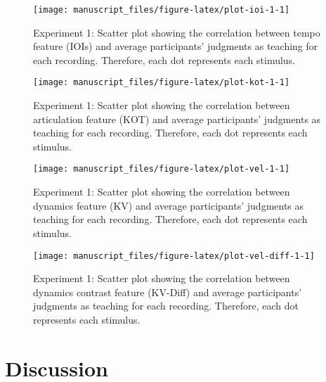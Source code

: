 \documentclass[
  man,floatsintext]{apa6}
\begin{document}
\begin{figure}

{\centering \texttt{[image: manuscript\_files/figure-latex/plot-ioi-1-1]} 

}

\caption{\label{fig:ioi-1}Experiment 1: Scatter plot showing the correlation between tempo feature (IOIs) and average participants' judgments as teaching for each recording. Therefore, each dot represents each stimulus.}\label{fig:plot-ioi-1}
\end{figure}

\begin{figure}

{\centering \texttt{[image: manuscript\_files/figure-latex/plot-kot-1-1]} 

}

\caption{\label{fig:kot-1}Experiment 1: Scatter plot showing the correlation between articulation feature (KOT) and average participants' judgments as teaching for each recording. Therefore, each dot represents each stimulus.}\label{fig:plot-kot-1}
\end{figure}

\begin{figure}

{\centering \texttt{[image: manuscript\_files/figure-latex/plot-vel-1-1]} 

}

\caption{\label{fig:vel-1}Experiment 1: Scatter plot showing the correlation between dynamics feature (KV) and average participants' judgments as teaching for each recording. Therefore, each dot represents each stimulus.}\label{fig:plot-vel-1}
\end{figure}

\begin{figure}

{\centering \texttt{[image: manuscript\_files/figure-latex/plot-vel-diff-1-1]} 

}

\caption{\label{fig:vel-diff-1}Experiment 1: Scatter plot showing the correlation between dynamics contrast feature (KV-Diff) and average participants' judgments as teaching for each recording. Therefore, each dot represents each stimulus.}\label{fig:plot-vel-diff-1}
\end{figure}

\clearpage

\hypertarget{discussion}{%
\section{Discussion}\label{discussion}}
\end{document}
